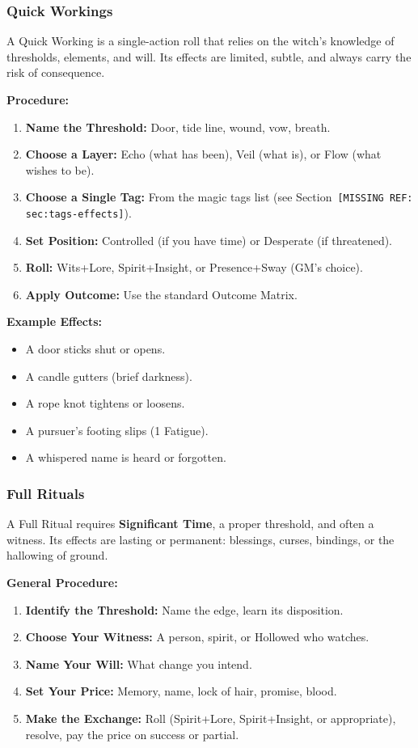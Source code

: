 \subsubsection{Quick Workings}

A Quick Working is a single-action roll that relies on the witch's knowledge of thresholds, elements, and will. Its effects are limited, subtle, and always carry the risk of consequence.

\textbf{Procedure:}
\begin{enumerate}
  \item \textbf{Name the Threshold:} Door, tide line, wound, vow, breath.
  \item \textbf{Choose a Layer:} Echo (what has been), Veil (what is), or Flow (what wishes to be).
  \item \textbf{Choose a Single Tag:} From the magic tags list (see Section~\texttt{[MISSING REF: sec:tags-effects]}).
  \item \textbf{Set Position:} Controlled (if you have time) or Desperate (if threatened).
  \item \textbf{Roll:} Wits+Lore, Spirit+Insight, or Presence+Sway (GM's choice).
  \item \textbf{Apply Outcome:} Use the standard Outcome Matrix.
\end{enumerate}

\textbf{Example Effects:}
\begin{itemize}
  \item A door sticks shut or opens.
  \item A candle gutters (brief darkness).
  \item A rope knot tightens or loosens.
  \item A pursuer's footing slips (1 Fatigue).
  \item A whispered name is heard or forgotten.
\end{itemize}

\subsubsection{Full Rituals}

A Full Ritual requires \textbf{Significant Time}, a proper threshold, and often a witness. Its effects are lasting or permanent: blessings, curses, bindings, or the hallowing of ground.

\textbf{General Procedure:}
\begin{enumerate}
  \item \textbf{Identify the Threshold:} Name the edge, learn its disposition.
  \item \textbf{Choose Your Witness:} A person, spirit, or Hollowed who watches.
  \item \textbf{Name Your Will:} What change you intend.
  \item \textbf{Set Your Price:} Memory, name, lock of hair, promise, blood.
  \item \textbf{Make the Exchange:} Roll (Spirit+Lore, Spirit+Insight, or appropriate), resolve, pay the price on success or partial.
\end{enumerate}

